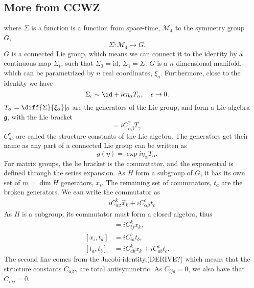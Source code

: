 \documentclass{article}
\begin{document}
\subsection*{More from CCWZ}
where $\Sigma$ is a function is a function from space-time, $\mathcal{M}_4$ to the symmetry group $G$,
\begin{equation}
    \Sigma : \mathcal{M}_4 \longrightarrow G.
\end{equation}
$G$ is a connected Lie group, which means we can connect it to the identity by a continuous map $\Sigma_t$, such that $\Sigma_0 = \mathrm{id}$, $\Sigma_1 = \Sigma$.
$G$ is a $n$ dimensional manifold, which can be parametrized by $n$ real coordinates, $\xi_a$.
Furthermore, close to the identity we have
\begin{equation}
    \Sigma_\epsilon \sim \id + i \epsilon \eta_\alpha T_\alpha, \quad \epsilon \rightarrow 0.
\end{equation}
$T_\alpha = \diff{\Sigma}{\xi_\alpha}|_0$ are the generators of the Lie group, and form a Lie algebra $\mathfrak{g}$, with the Lie bracket
\begin{equation}
    [T_\alpha, T_\beta] = iC_{\alpha\beta}^\gamma T_\gamma.
\end{equation}
$C_{ab}^c$ are called the structure constants of the Lie algebra.
The generators get their name as any part of a connected Lie group can be written as 
\begin{equation}
    g(\eta) = \exp{i\eta_\alpha T_\alpha}.
\end{equation}
For matrix groups, the lie bracket is the commutator, and the exponential is defined through the series expansion.
As $H$ form a subgroup of $G$, it has its own set of $m = \dim H$ generators, $ x_{i}$.
The remaining set of commutators, $t_{a}$ are the broken generators.
We can write the commutator as
\begin{align}
    [T_\alpha, T_\beta] = i C_{\alpha \beta }^{k} \hat x_k + i C_{\alpha \beta }^c t_c
\end{align}
As $H$ is a subgroup, its commutator must form a closed algebra, thus
\begin{align}
    [x_i, x_j] &= i C_{i j}^{k} x_k,\\
    [x_i, t_a] &= i C_{i a}^b t_b, \\
    [t_a, t_b] &= i C_{ab}^k x_k + i C_{ab}^c t_c.
\end{align}
The second line comes from the Jacobi-identity,(DERIVE?) which means that the structure constants $C_{\alpha \beta \gamma}$ are total antisymmetric.
As $C_{ija} = 0$, we also have that $C_{iaj} = 0$.
\end{document}
